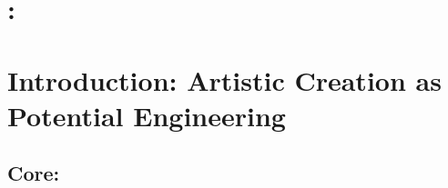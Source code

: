 \documentclass[12pt,a4paper]{article}
\theoremstyle{remark}
\begin{document}
\begin{abstract}
This paper is bilingual (Chinese/English) with a complete theorem system, formal proofs, art-historical case analyses, potential surface visualizations, and honest critique markings. Core conclusion: Creation is not self-expression --- creation is the precise calculation of the jump magnitude on the audience's potential surface, placing it exactly below the critical threshold.
\medskip
\noindent\textbf{Keywords/Keywords: }
Artistic Potential; ; $\Delta$; 11; ; ; ; ; Equality Principle
\medskip
\noindent
Artistic Potential Surface; Controlled Potential Jump; Aesthetic $\Delta$; Theorem 11 Singularity Attack; Kitsch and Incomprehensibility; Artist Coordinate System; Audience Coordinate System; Gauge Fixing; Equality Principle
\end{abstract}
\tableofcontents
\section{:}
\section{Introduction: Artistic Creation as Potential Engineering}
\subsection{Core:}
\end{document}
